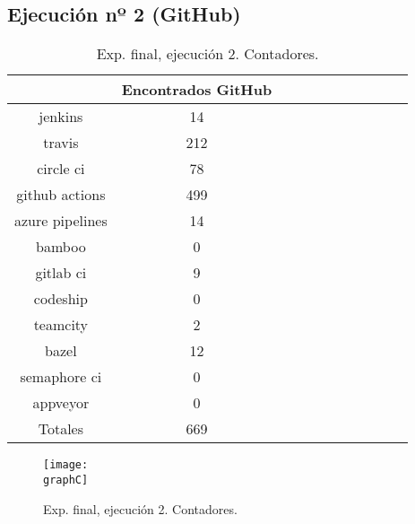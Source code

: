 \subsection{Ejecución nº 2 (GitHub)}
\begin{table}[h]
  \centering
  \caption{Exp. final, ejecución 2. Contadores.}
  \label{tab:tabla_f2_1}

\begin{footnotesize}
\renewcommand{\arraystretch}{1.5} %
\begin{tabular}{ccccccccccc}
  \hline
  {} &  Encontrados GitHub \\
  \hline
  jenkins         &                  14 \\
  travis          &                 212 \\
  circle ci       &                  78 \\
  github actions  &                 499 \\
  azure pipelines &                  14 \\
  bamboo          &                   0 \\
  gitlab ci       &                   9 \\
  codeship        &                   0 \\
  teamcity        &                   2 \\
  bazel           &                  12 \\
  semaphore ci    &                   0 \\
  appveyor        &                   0 \\
  \hline
  Totales         &                 669 \\
 \end{tabular}
\end{footnotesize}

\end{table}

\begin{figure}
  \centering
  \texttt{[image: \\graphC]}
  \caption{Exp. final, ejecución 2. Contadores.}
\end{figure}

